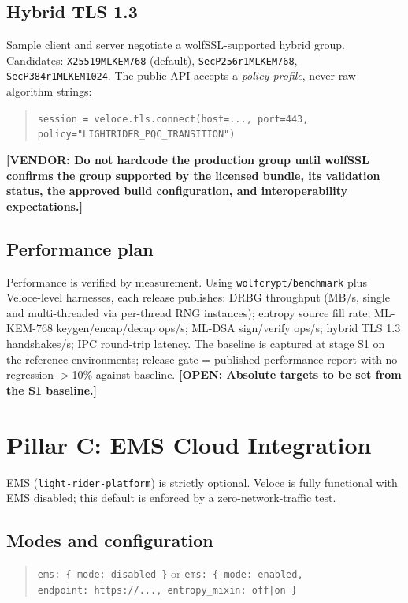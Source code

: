 \documentclass[10pt]{article}
\newcommand{\dep}[1]{\textcolor{warnred}{\sffamily\bfseries\small [VENDOR: #1]}}
\newcommand{\open}[1]{\textcolor{fipsgold}{\sffamily\bfseries\small [OPEN: #1]}}
\newcommand{\code}[1]{\texttt{\small #1}}
\begin{document}
\subsection{Hybrid TLS 1.3}
Sample client and server negotiate a wolfSSL-supported hybrid group. Candidates:
\code{X25519MLKEM768} (default), \code{SecP256r1MLKEM768}, \code{SecP384r1MLKEM1024}.
The public API accepts a \emph{policy profile}, never raw algorithm strings:

\begin{quote}
\code{session = veloce.tls.connect(host=..., port=443, policy="LIGHTRIDER\_PQC\_TRANSITION")}
\end{quote}

\dep{Do not hardcode the production group until wolfSSL confirms the group supported by
the licensed bundle, its validation status, the approved build configuration, and
interoperability expectations.}

\subsection{Performance plan}
Performance is verified by measurement. Using
\code{wolfcrypt/benchmark} plus Veloce-level harnesses, each release publishes:
DRBG throughput (MB/s, single and multi-threaded via per-thread RNG instances);
entropy source fill rate; ML-KEM-768 keygen/encap/decap ops/s; ML-DSA sign/verify ops/s;
hybrid TLS 1.3 handshakes/s; IPC round-trip latency. The baseline is captured at stage S1
on the reference environments; release gate = published performance report with no
regression $>$10\% against baseline. \open{Absolute targets to be set from the S1
baseline.}

\section{Pillar C: EMS Cloud Integration}\label{sec:ems}

EMS (\code{light-rider-platform}) is strictly optional. Veloce is fully functional with
EMS disabled; this default is enforced by a zero-network-traffic test.

\subsection{Modes and configuration}
\begin{quote}
\code{ems:\ \{ mode:\ disabled \}} \hfill or \hfill
\code{ems:\ \{ mode:\ enabled, endpoint:\ https://..., entropy\_mixin:\ off|on \}}
\end{quote}
\end{document}
